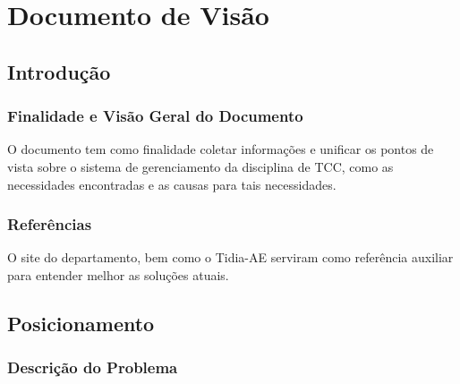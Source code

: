 \chapter{Documento de Visão}

\section{Introdução}
\subsection{Finalidade e Visão Geral do Documento}

O documento tem como finalidade coletar informações e unificar os pontos de vista sobre o sistema de gerenciamento da disciplina de TCC, como as necessidades encontradas e as causas para tais necessidades.

\subsection{Referências}

O site do departamento, bem como o Tidia-AE serviram como referência auxiliar para entender melhor as soluções atuais.

\section{Posicionamento}
\subsection{Descrição do Problema}

\begin{table}[!htb]
    \centering
    \caption{Descrição básica do problema}
    \label{my-label}
\end{table}

